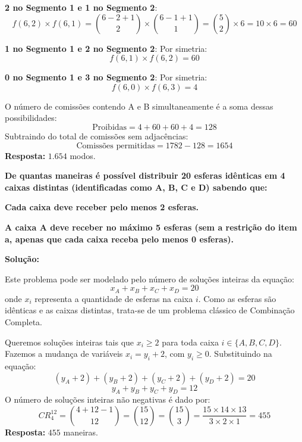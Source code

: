 \documentclass[a4paper,10pt,landscape,twocolumn]{article}  %
\let\oldenumerate\enumerate
\let\oldendenumerate\endenumerate
\renewenvironment{enumerate}{%
  \oldenumerate%
  \setlength{\itemsep}{1pt}%
  \setlength{\parskip}{0pt}%
  \setlength{\parsep}{0pt}%
  \setlength{\topsep}{2pt}%
  \setlength{\partopsep}{0pt}%
}{%
  \oldendenumerate%
}
\let\olditemize\itemize
\let\oldenditemize\enditemize
\renewenvironment{itemize}{%
  \olditemize%
  \setlength{\itemsep}{1pt}%
  \setlength{\parskip}{0pt}%
  \setlength{\parsep}{0pt}%
  \setlength{\topsep}{2pt}%
  \setlength{\partopsep}{0pt}%
}{%
  \oldenditemize%
}
\begin{document}
\begin{enumerate}
\begin{enumerate}
\begin{itemize}
\begin{itemize}
                \item \textbf{2 no Segmento 1 e 1 no Segmento 2}:
                \[ f(6, 2) \times f(6, 1) = \binom{6-2+1}{2} \times \binom{6-1+1}{1} = \binom{5}{2} \times 6 = 10 \times 6 = 60 \]
                \item \textbf{1 no Segmento 1 e 2 no Segmento 2}: Por simetria:
                \[ f(6, 1) \times f(6, 2) = 60 \]
                \item \textbf{0 no Segmento 1 e 3 no Segmento 2}: Por simetria:
                \[ f(6, 0) \times f(6, 3) = 4 \]
            \end{itemize}
            \item O número de comissões contendo A e B simultaneamente é a soma dessas possibilidades:
            \[ \text{Proibidas} = 4 + 60 + 60 + 4 = 128 \]
        \end{itemize}
        Subtraindo do total de comissões sem adjacências:
        \[ \text{Comissões permitidas} = 1782 - 128 = 1654 \]
        \textbf{Resposta:} $1.654$ modos.
    \end{enumerate}

    \item \textbf{De quantas maneiras é possível distribuir 20 esferas idênticas em 4 caixas distintas (identificadas como A, B, C e D) sabendo que:}
    \begin{enumerate}
        \item \textbf{Cada caixa deve receber pelo menos 2 esferas.}
        \item \textbf{A caixa A deve receber no máximo 5 esferas (sem a restrição do item a, apenas que cada caixa receba pelo menos 0 esferas).}
    \end{enumerate}
    
    \textbf{Solução:}
    
    Este problema pode ser modelado pelo número de soluções inteiras da equação:
    \[ x_A + x_B + x_C + x_D = 20 \]
    onde $x_i$ representa a quantidade de esferas na caixa $i$. Como as esferas são idênticas e as caixas distintas, trata-se de um problema clássico de Combinação Completa.
    
    \begin{enumerate}
        \item Queremos soluções inteiras tais que $x_i \ge 2$ para toda caixa $i \in \{A, B, C, D\}$.
        Fazemos a mudança de variáveis $x_i = y_i + 2$, com $y_i \ge 0$. Substituindo na equação:
        \[ (y_A + 2) + (y_B + 2) + (y_C + 2) + (y_D + 2) = 20 \]
        \[ y_A + y_B + y_C + y_D = 12 \]
        O número de soluções inteiras não negativas é dado por:
        \[ CR_4^{12} = \binom{4+12-1}{12} = \binom{15}{12} = \binom{15}{3} = \frac{15 \times 14 \times 13}{3 \times 2 \times 1} = 455 \]
        \textbf{Resposta:} $455$ maneiras.
        

\end{enumerate}
\end{enumerate}
\end{document}
